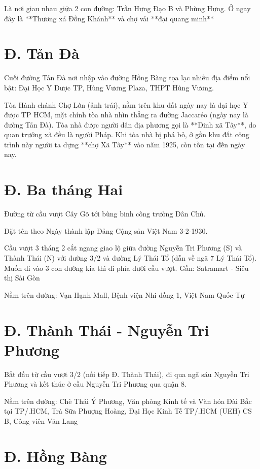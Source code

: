 Là nơi giau nhau giữa 2 con đường: Trần Hưng Đạo B và Phùng Hưng. Ở ngay đây là **Thương xá Đồng Khánh** và chợ vải **đại quang minh**

\section{Đ. Tản Đà}

Cuối đường Tản Đà nơi nhập vào đường Hồng Bàng tọa lạc nhiều địa điểm nổi bật: Đại Học Y Dược TP, Hùng Vương Plaza, THPT Hùng Vương.

Tòa Hành chánh Chợ Lớn (ảnh trái), nằm trên khu đất ngày nay là đại học Y được TP HCM, mặt chính tòa nhà nhìn thẳng ra đường Jaccaréo (ngày nay là đường Tản Đà). Tòa nhà được người dân địa phương gọi là **Dinh xã Tây**, do quan trưởng xã đều là người Pháp. Khi tòa nhà bị phá bỏ, ở gần khu đất công trình này người ta dựng **chợ Xã Tây** vào năm 1925, còn tồn tại đến ngày nay.

\section{Đ. Ba tháng Hai}

Đường từ cầu vượt Cây Gõ tới bùng binh công trường Dân Chủ.

Đặt tên theo Ngày thành lập Đảng Cộng sản Việt Nam 3-2-1930.

Cầu vượt 3 tháng 2 cắt ngang giao lộ giữa đường Nguyễn Tri Phương (S) và Thành Thái (N) với đường 3/2 và đường Lý Thái Tổ (dẫn về ngã 7 Lý Thái Tổ). Muốn đi vào 3 con đường kia thì đi phía dưới cầu vượt. Gần: Satramart - Siêu thị Sài Gòn

Nằm trên đường: Vạn Hạnh Mall, Bệnh viện Nhi đồng 1, Việt Nam Quốc Tự

\section{Đ. Thành Thái - Nguyễn Tri Phương}

Bắt đầu từ cầu vượt 3/2 (nối tiếp Đ. Thành Thái), đi qua ngã sáu Nguyễn Tri Phương và kết thúc ở cầu Nguyễn Tri Phương qua quận 8.

Nằm trên đường: Chè Thái Ý Phương, Văn phòng Kinh tế và Văn hóa Đài Bắc tại TP/.HCM, Trà Sữa Phượng Hoàng, Đại Học Kinh Tế TP/.HCM (UEH) CS B, Công viên Văn Lang

\section{Đ. Hồng Bàng}

